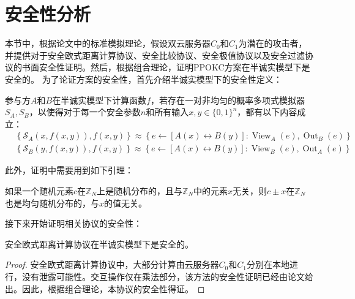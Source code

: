 \section{安全性分析}
\label{s3-lilun}
本节中，根据论文\cite{goldreich2004encryption}中的标准模拟理论，假设双云服务器$ C_0$和$ C_1$为潜在的攻击者，并提供对于安全欧式距离计算协议、安全比较协议、安全极值协议以及安全过滤协议的书面安全性证明。然后，根据组合理论，证明PPOKC方案在半诚实模型下是安全的。 为了论证方案的安全性，首先介绍半诚实模型下的安全性定义\cite{bogdanov2008sharemind}：
\begin{definition}
	参与方$ A $和$ B $在半诚实模型下计算函数$ f $，若存在一对非均匀的概率多项式模拟器$ S_A,S_B $，以使得对于每一个安全参数$ n $和所有输入$ x,y\in\{0,1\}^n $，都有以下内容成立：
	\begin{equation}
		\begin{aligned}
			 & \left\{\mathcal{S}_A(x, f(x, y)), f(x, y)\right\} \approx\left\{e \leftarrow[A(x) \leftrightarrow B(y)]: \operatorname{View}_A(e), \operatorname{Out}_B(e)\right\} \\
			 & \left\{\mathcal{S}_B(y, f(x, y)), f(x, y)\right\} \approx\left\{e \leftarrow[A(x) \leftrightarrow B(y)]: \operatorname{View}_B(e), \operatorname{Out}_A(e)\right\}
		\end{aligned}
	\end{equation}
\end{definition}

此外，证明中需要用到如下引理：

\begin{lemma}
	\label{s3-lemma1}
	如果一个随机元素$ c $在$ \mathbb{Z}_N $上是随机分布的，且与$ \mathbb{Z}_N $中的元素$ x $无关，则$ c\pm x$在$ \mathbb{Z}_N $也是均匀随机分布的，与$ x $的值无关。
\end{lemma}

接下来开始证明相关协议的安全性：

\begin{theorem}
	安全欧式距离计算协议在半诚实模型下是安全的。
\end{theorem}
\begin{proof}
	安全欧式距离计算协议中，大部分计算由云服务器$ C_0 $和$ C_1 $分别在本地进行，没有泄露可能性。交互操作仅在乘法部分，该方法的安全性证明已经由论文\cite{beaver1992efficient}给出。因此，根据组合理论，本协议的安全性得证。
\end{proof}

